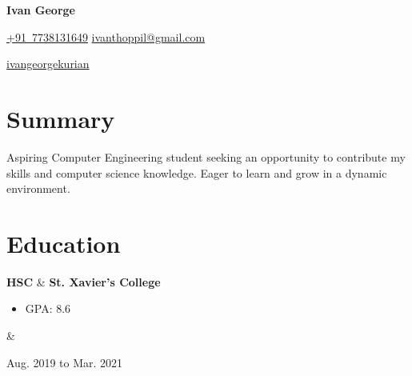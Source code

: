 \documentclass[12pt, letterpaper]{article}
\newenvironment{highlights}{
        \begin{itemize}[
                topsep=0pt,
                parsep=0.10 cm,
                partopsep=0pt,
                itemsep=0pt,
                after=\vspace{-1\baselineskip},
                leftmargin=0.4 cm + 3pt
            ]
    }{
        \end{itemize}
    } %
\newenvironment{header}{
        \setlength{\topsep}{0pt}\par\kern\topsep\centering\color{primaryColor}\linespread{1.5}
    }{
        \par\kern\topsep
    } %
\newcommand{\placelastupdatedtext}{%
  \AddToShipoutPictureFG*{%
    \put(
        \LenToUnit{\paperwidth-2 cm-0.2 cm+0.05cm},
        \LenToUnit{\paperheight-1.0 cm}
    ){\vtop{{\null}\makebox[0pt][c]{
        \small\color{gray}\textit{}\hspace{\widthof{}}
    }}}%
  }%
}%
\let\hrefWithoutArrow\href
\renewcommand{\href}[2]{\hrefWithoutArrow{#1}{\mbox{\ifthenelse{\equal{#2}{}}{ }{#2 }\raisebox{.15ex}{\footnotesize \faExternalLink*}}}}
\let\originalTabularx\tabularx
\let\originalEndTabularx\endtabularx
\renewenvironment{tabularx}{\bgroup\centering\originalTabularx}{\originalEndTabularx\par\egroup}
\begin{document}
    \placelastupdatedtext
    \begin{header}
        \fontsize{30 pt}{30 pt}
        \textbf{Ivan George}

        \vspace{0.3 cm}

        \normalsize
        \mbox{\hrefWithoutArrow{tel:+91 7738131649}{{\footnotesize\faPhone*}\hspace*{0.13cm}+91 7738131649}}
        \hspace*{0.5 cm}
        \mbox{\hrefWithoutArrow{mailto:ivanthoppil@gmail.com}{{\small\faEnvelope[regular]}\hspace*{0.13cm}ivanthoppil@gmail.com}}
        \hspace*{0.5 cm}
       
        \mbox{\hrefWithoutArrow{https://linkedin.com/in/ivan-george-kurian}{{\small\faLinkedinIn}\hspace*{0.13cm}ivangeorgekurian}}
        \hspace*{0.5 cm}
      
    \end{header}

    \vspace{0.3 cm}


    \section{Summary}

        \begin{changemargin}{0.2 cm}{0.2 cm}
        Aspiring Computer Engineering student seeking an opportunity to contribute my skills and computer science knowledge. Eager to learn and grow in a dynamic environment.
        
        \end{changemargin}





    
    \section{Education}

        \begin{tabularx}{
            \textwidth-0.4 cm-0.13cm
        }{
            L{1.5cm}
            K{0.2 cm}
            R{4.1 cm}
        }
            \textbf{HSC}
            &
            \textbf{St. Xavier's College}

            \vspace{0.10 cm}

            \begin{highlights}
                \item GPA: 8.6
            \end{highlights}
            &
            

            Aug. 2019 to Mar. 2021
        \end{tabularx}
\end{document}
